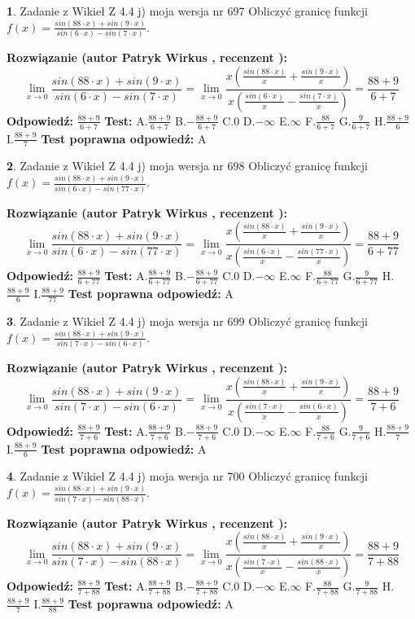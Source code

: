 \documentclass[12pt, a4paper]{article}
\theoremstyle{definition} %
\newtheorem{zad}{}
\newcommand{\zadStart}[1]{\begin{zad}#1\newline}
\newcommand{\zadStop}{\end{zad}}
\newcommand{\rozwStart}[2]{\noindent \textbf{Rozwiązanie (autor #1 , recenzent #2): }\newline}
\newcommand{\rozwStop}{\newline}
\newcommand{\odpStart}{\noindent \textbf{Odpowiedź:}\newline}
\newcommand{\odpStop}{\newline}
\newcommand{\testStart}{\noindent \textbf{Test:}\newline}
\newcommand{\testStop}{\newline}
\newcommand{\kluczStart}{\noindent \textbf{Test poprawna odpowiedź:}\newline}
\newcommand{\kluczStop}{\newline}
\begin{document}
\zadStart{Zadanie z Wikieł Z 4.4 j) moja wersja nr 697}
Obliczyć granicę funkcji $f(x)=\frac{sin(88\cdot x) +sin(9\cdot x)}{sin(6\cdot x) -sin(7\cdot x)}$.
\zadStop
\rozwStart{Patryk Wirkus}{}
$$\lim\limits_{x\to 0}\frac{sin(88\cdot x) +sin(9\cdot x)}{sin(6\cdot x) -sin(7\cdot x)}=\lim\limits_{x\to 0}\frac{x(\frac{sin(88\cdot x)}{x}+\frac{sin(9\cdot x)}{x})}{x(\frac{sin(6\cdot x)}{x}-\frac{sin(7\cdot x)}{x})}=\frac{88+9}{6+7}$$
\rozwStop
\odpStart
$\frac{88+9}{6+7}$
\odpStop
\testStart
A.$\frac{88+9}{6+7}$
B.$-\frac{88+9}{6+7}$
C.$0$
D.$-\infty$
E.$\infty$
F.$\frac{88}{6+7}$
G.$\frac{9}{6+7}$
H.$\frac{88+9}{6}$
I.$\frac{88+9}{7}$
\testStop
\kluczStart
A
\kluczStop



\zadStart{Zadanie z Wikieł Z 4.4 j) moja wersja nr 698}
Obliczyć granicę funkcji $f(x)=\frac{sin(88\cdot x) +sin(9\cdot x)}{sin(6\cdot x) -sin(77\cdot x)}$.
\zadStop
\rozwStart{Patryk Wirkus}{}
$$\lim\limits_{x\to 0}\frac{sin(88\cdot x) +sin(9\cdot x)}{sin(6\cdot x) -sin(77\cdot x)}=\lim\limits_{x\to 0}\frac{x(\frac{sin(88\cdot x)}{x}+\frac{sin(9\cdot x)}{x})}{x(\frac{sin(6\cdot x)}{x}-\frac{sin(77\cdot x)}{x})}=\frac{88+9}{6+77}$$
\rozwStop
\odpStart
$\frac{88+9}{6+77}$
\odpStop
\testStart
A.$\frac{88+9}{6+77}$
B.$-\frac{88+9}{6+77}$
C.$0$
D.$-\infty$
E.$\infty$
F.$\frac{88}{6+77}$
G.$\frac{9}{6+77}$
H.$\frac{88+9}{6}$
I.$\frac{88+9}{77}$
\testStop
\kluczStart
A
\kluczStop



\zadStart{Zadanie z Wikieł Z 4.4 j) moja wersja nr 699}
Obliczyć granicę funkcji $f(x)=\frac{sin(88\cdot x) +sin(9\cdot x)}{sin(7\cdot x) -sin(6\cdot x)}$.
\zadStop
\rozwStart{Patryk Wirkus}{}
$$\lim\limits_{x\to 0}\frac{sin(88\cdot x) +sin(9\cdot x)}{sin(7\cdot x) -sin(6\cdot x)}=\lim\limits_{x\to 0}\frac{x(\frac{sin(88\cdot x)}{x}+\frac{sin(9\cdot x)}{x})}{x(\frac{sin(7\cdot x)}{x}-\frac{sin(6\cdot x)}{x})}=\frac{88+9}{7+6}$$
\rozwStop
\odpStart
$\frac{88+9}{7+6}$
\odpStop
\testStart
A.$\frac{88+9}{7+6}$
B.$-\frac{88+9}{7+6}$
C.$0$
D.$-\infty$
E.$\infty$
F.$\frac{88}{7+6}$
G.$\frac{9}{7+6}$
H.$\frac{88+9}{7}$
I.$\frac{88+9}{6}$
\testStop
\kluczStart
A
\kluczStop



\zadStart{Zadanie z Wikieł Z 4.4 j) moja wersja nr 700}
Obliczyć granicę funkcji $f(x)=\frac{sin(88\cdot x) +sin(9\cdot x)}{sin(7\cdot x) -sin(88\cdot x)}$.
\zadStop
\rozwStart{Patryk Wirkus}{}
$$\lim\limits_{x\to 0}\frac{sin(88\cdot x) +sin(9\cdot x)}{sin(7\cdot x) -sin(88\cdot x)}=\lim\limits_{x\to 0}\frac{x(\frac{sin(88\cdot x)}{x}+\frac{sin(9\cdot x)}{x})}{x(\frac{sin(7\cdot x)}{x}-\frac{sin(88\cdot x)}{x})}=\frac{88+9}{7+88}$$
\rozwStop
\odpStart
$\frac{88+9}{7+88}$
\odpStop
\testStart
A.$\frac{88+9}{7+88}$
B.$-\frac{88+9}{7+88}$
C.$0$
D.$-\infty$
E.$\infty$
F.$\frac{88}{7+88}$
G.$\frac{9}{7+88}$
H.$\frac{88+9}{7}$
I.$\frac{88+9}{88}$
\testStop
\kluczStart
A
\kluczStop
\end{document}
